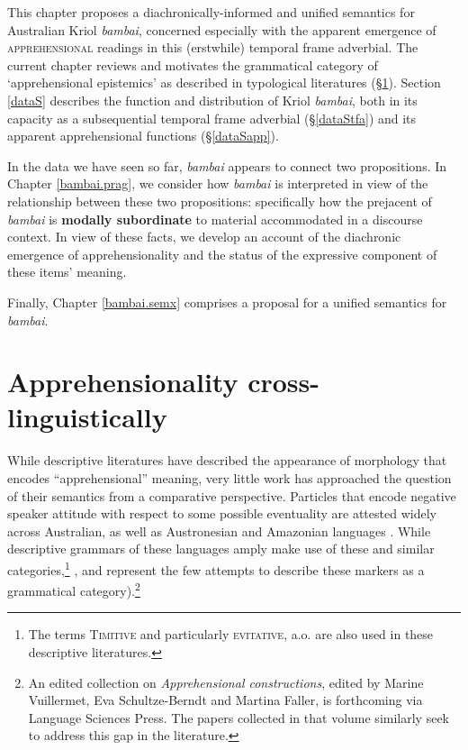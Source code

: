 This chapter proposes a diachronically-informed and unified semantics for Australian Kriol \textit{bambai}, concerned especially with the apparent emergence of \textsc{apprehensional} readings in this (erstwhile) temporal frame adverbial. 
The current chapter reviews and motivates the grammatical category of `apprehensional epistemics' as described in typological literatures (\S\thinspace\ref{typS}). Section \ref{dataS} describes the function and distribution of Kriol \textit{bambai}, both in its capacity as a subsequential temporal frame adverbial (§\thinspace\ref{dataStfa}) and its apparent apprehensional functions (§\thinspace\ref{dataSapp}). 

In the data we have seen so far, \textit{bambai} appears to connect two propositions. In Chapter \ref{bambai.prag}, we consider how \textit{bambai} is interpreted in view of the relationship between these two propositions: specifically how the prejacent of \textit{bambai} is \textbf{modally subordinate} to material accommodated in a discourse context. In view of these facts, we develop an account of the diachronic emergence of apprehensionality and the status of the expressive component of these items' meaning.

Finally, Chapter \ref{bambai.semx} comprises a proposal for a unified semantics for \textit{bambai}.%





\section{Apprehensionality cross-linguistically}\label{typS}
While descriptive literatures have described the appearance of morphology that encodes ``apprehensional'' meaning, very little work has approached the question of their semantics from a comparative perspective. Particles that encode negative speaker attitude with respect to some possible eventuality are attested widely across Australian, as well as Austronesian and Amazonian languages \citep[258]{Angelo2016}. While descriptive grammars of these languages amply make use of these and similar categories,\footnote{The terms \textsc{Timitive} and particularly \textsc{evitative}, a.o. are also used in these descriptive literatures.} \citet{Lichtenberk1995}, \citet{Angelo2016,Angelo2018} and \cite{Vuillermet2018} represent the few attempts to describe these markers as a grammatical category).\footnote{An edited collection on  \textit{Apprehensional constructions}, edited by Marine Vuillermet, Eva Schultze-Berndt and Martina Faller, is forthcoming via Language Sciences Press. The papers collected in that volume similarly seek to address this gap in the literature.}

